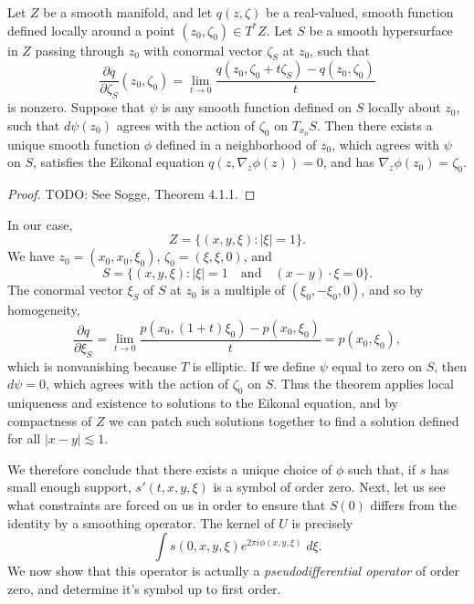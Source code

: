 \begin{lemma}
    Let $Z$ be a smooth manifold, and let $q(z,\zeta)$ be a real-valued, smooth function defined locally around a point $(z_0,\zeta_0) \in T^*Z$. Let $S$ be a smooth hypersurface in $Z$ passing through $z_0$ with conormal vector $\zeta_S$ at $z_0$, such that
    \[ \frac{\partial q}{\partial \zeta_S}(z_0,\zeta_0) = \lim_{t \to 0} \frac{q(z_0,\zeta_0 + t \zeta_S) - q(z_0,\zeta_0)}{t} \]
    is nonzero. Suppose that $\psi$ is any smooth function defined on $S$ locally about $z_0$, such that $d \psi(z_0)$ agrees with the action of $\zeta_0$ on $T_{x_0} S$. Then there exists a unique smooth function $\phi$ defined in a neighborhood of $z_0$, which agrees with $\psi$ on $S$, satisfies the Eikonal equation $q(z,\nabla_z \phi(z)) = 0$, and has $\nabla_z \phi(z_0) = \zeta_0$.
\end{lemma}
\begin{proof}
    TODO: See Sogge, Theorem 4.1.1.
\end{proof}

In our case,
%
\[ Z = \{ (x,y,\xi) : |\xi| = 1 \}. \]
%
We have $z_0 = (x_0,x_0,\xi_0)$, $\zeta_0 = (\xi,\xi,0)$, and
%
\[ S = \{ (x,y,\xi): |\xi| = 1 \quad\text{and}\quad (x - y) \cdot \xi = 0 \}. \]
%
The conormal vector $\xi_S$ of $S$ at $z_0$ is a multiple of $(\xi_0,-\xi_0,0)$, and so by homogeneity,
%
\[ \frac{\partial q}{\partial \xi_S} = \lim_{t \to 0} \frac{p(x_0,(1 + t)\xi_0) - p(x_0,\xi_0)}{t} = p(x_0,\xi_0), \]
%
which is nonvanishing because $T$ is elliptic. If we define $\psi$ equal to zero on $S$, then $d \psi = 0$, which agrees with the action of $\zeta_0$ on $S$. Thus the theorem applies local uniqueness and existence to solutions to the Eikonal equation, and by compactness of $Z$ we can patch such solutions together to find a solution defined for all $|x - y| \lesssim 1$.

We therefore conclude that there exists a unique choice of $\phi$ such that, if $s$ has small enough support, $s'(t,x,y,\xi)$ is a symbol of order zero. Next, let us see what constraints are forced on us in order to ensure that $S(0)$ differs from the identity by a smoothing operator. The kernel of $U$ is precisely
%
\[ \int s(0,x,y,\xi) e^{2 \pi i \phi(x,y,\xi)}\; d\xi. \]
%
We now show that this operator is actually a \emph{pseudodifferential operator} of order zero, and determine it's symbol up to first order.

